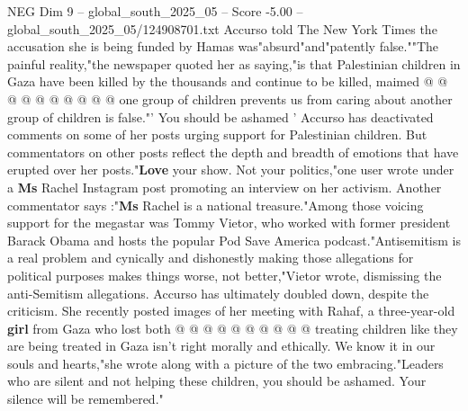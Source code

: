 \begin{textsample}{NEG Dim 9 – global\_south\_2025\_05 – Score -5.00 – global\_south\_2025\_05/124908701.txt}
Accurso told The New York Times the accusation she is being funded by Hamas was"absurd"and"patently false.""The painful reality,"the newspaper quoted her as saying,"is that Palestinian children in Gaza have been killed by the thousands and continue to be killed, maimed @ @ @ @ @ @ @ @ @ @ one group of children prevents us from caring about another group of children is false."' You should be ashamed ' Accurso has deactivated comments on some of her posts urging support for Palestinian children.
But commentators on other posts reflect the depth and breadth of emotions that have erupted over her posts."\textbf{Love} your show.
Not your politics,"one user wrote under a \textbf{Ms} Rachel Instagram post promoting an interview on her activism.
Another commentator says :"\textbf{Ms} Rachel is a national treasure."Among those voicing support for the megastar was Tommy Vietor, who worked with former president Barack Obama and hosts the popular Pod Save America podcast."Antisemitism is a real problem and cynically and dishonestly making those allegations for political purposes makes things worse, not better,"Vietor wrote, dismissing the anti-Semitism allegations.
Accurso has ultimately doubled down, despite the criticism.
She recently posted images of her meeting with Rahaf, a three-year-old \textbf{girl} from Gaza who lost both @ @ @ @ @ @ @ @ @ @ treating children like they are being treated in Gaza isn't right morally and ethically.
We know it in our souls and hearts,"she wrote along with a picture of the two embracing."Leaders who are silent and not helping these children, you should be ashamed.
Your silence will be remembered."

\end{textsample}
